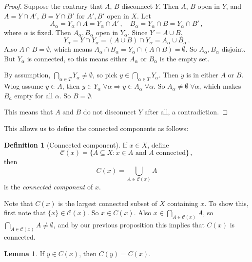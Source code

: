 \documentclass[a4paper,11pt]{article}
\theoremstyle{definition}
\newtheorem*{defn}{Definition}
\newtheorem*{lem}{Lemma}
\numberwithin{equation}{section}
\begin{document}
\begin{proof}
Suppose the contrary that $A$, $B$ disconnect $Y$. Then $A$, $B$ open in $Y$, and $A=Y\cap A'$, $B=Y\cap B'$ for $A',B'$ open in $X$. Let
\begin{equation}
    A_\alpha=Y_\alpha\cap A=Y_\alpha\cap A'\,,\quad B_\alpha=Y_\alpha\cap B=Y_\alpha\cap B'\,,
\end{equation}
where $\alpha$ is fixed. Then $A_\alpha, B_\alpha$ open in $Y_\alpha$. Since $Y=A\cup B$,
\begin{equation}
    Y_\alpha=Y\cap Y_\alpha=(A\cup B)\cap Y_\alpha=A_\alpha\cup B_\alpha\,.
\end{equation}
Also $A\cap B=\emptyset$, which means $A_\alpha\cap B_\alpha=Y_\alpha\cap(A\cap B)=\emptyset$. So $A_\alpha,B_\alpha$ disjoint. But $Y_\alpha$ is connected, so this means either $A_\alpha$ or $B_\alpha$ is the empty set.

By assumption, $\bigcap_{\alpha\in T}Y_\alpha\neq\emptyset$, so pick $y\in\bigcap_{\alpha\in T}Y_\alpha$. Then $y$ is in either $A$ or $B$. Wlog assume $y\in A$, then $y\in Y_\alpha\;\forall\alpha\Rightarrow y\in A_\alpha\;\forall\alpha$. So $A_\alpha\neq\emptyset\;\forall\alpha$, which makes $B_a$ empty for all $\alpha$. So $B=\emptyset$.

This means that $A$ and $B$ do not disconnect $Y$ after all, a contradiction.
\end{proof}

This allows us to define the connected components as follows:

\begin{defn}[Connected component]
    If $x\in X$, define
    \begin{equation}
        \mathcal{C}(x)=\{A\subseteq X:x\in A\text{ and }A\text{ connected}\}\,,
    \end{equation}
    then 
    \begin{equation}
        C(x)=\bigcup_{A\in\mathcal{C}(x)}A
    \end{equation}
    is the \emph{connected component} of $x$.
\end{defn}

Note that $C(x)$ is the largest connected subset of $X$ containing $x$. To show this, first note that $\{x\}\in\mathcal{C}(x)$. So $x\in C(x)$. Also $x\in\bigcap_{A\in \mathcal{C}(x)} A$, so $\bigcap_{A\in\mathcal{C}(x)}A\neq\emptyset$, and by our previous proposition this implies that $C(x)$ is connected.

\begin{lem}
    If $y\in C(x)$, then $C(y)=C(x)$.
\end{lem}
\end{document}
